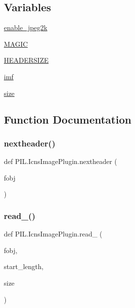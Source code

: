 \subsection*{Variables}
\begin{DoxyCompactItemize}
\item 
\hyperlink{namespacePIL_1_1IcnsImagePlugin_ac0c766f4202254649e1deaffc0ef2a72}{enable\+\_\+jpeg2k}
\item 
\hyperlink{namespacePIL_1_1IcnsImagePlugin_af8c8b40d6f23bc09ff8e1b74114a5117}{M\+A\+G\+IC}
\item 
\hyperlink{namespacePIL_1_1IcnsImagePlugin_a68cbcb95aff3258bf6d763787498a491}{H\+E\+A\+D\+E\+R\+S\+I\+ZE}
\item 
\hyperlink{namespacePIL_1_1IcnsImagePlugin_a036eb44af4fd8f5920acf050a0644e37}{imf}
\item 
\hyperlink{namespacePIL_1_1IcnsImagePlugin_af38cbea1c9c068b8c6603f57be6b4040}{size}
\end{DoxyCompactItemize}


\subsection{Function Documentation}
\mbox{\label{namespacePIL_1_1IcnsImagePlugin_a5f63f526d534967e2f23c0f30ed7ecde}} 
\subsubsection{\texorpdfstring{nextheader()}{nextheader()}}
{\footnotesize\ttfamily def P\+I\+L.\+Icns\+Image\+Plugin.\+nextheader (\begin{DoxyParamCaption}\item[{}]{fobj }\end{DoxyParamCaption})}

\mbox{\label{namespacePIL_1_1IcnsImagePlugin_a75c273b82b925f03223d6cf4c01fcf86}} 
\subsubsection{\texorpdfstring{read\+\_()}{read\_32()}}
{\footnotesize\ttfamily def P\+I\+L.\+Icns\+Image\+Plugin.\+read\+\_ (\begin{DoxyParamCaption}\item[{}]{fobj,  }\item[{}]{start\+\_\+length,  }\item[{}]{size }\end{DoxyParamCaption})}

